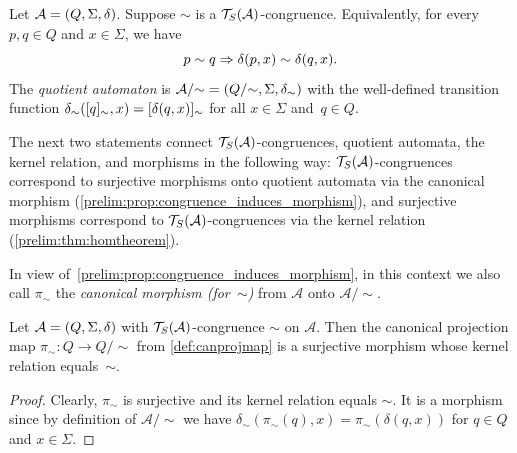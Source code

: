 
 \label{def:factor_aut}
Let $\mathcal A = (Q, \Sigma, \delta)$. Suppose $\sim$ is a $\mathcal T_S(\mathcal A)$-congruence. 
Equivalently, for every $p,q \in Q$ and $x \in \Sigma$,
we have
\begin{equation}\label{prelim:eqn:TS-congruence}
	p \sim q \Rightarrow \delta(p,x) \sim \delta(q,x).
\end{equation}
The \emph{quotient automaton} is $\mathcal A / {\sim} = (Q / {\sim}, \Sigma, \delta_{\sim})$ 
with the well-defined transition function $\delta_{\sim}([q]_{\sim},x) = [\delta(q,x)]_{\sim}$
for all $x \in \Sigma$ and~$q \in Q$.

The next two statements connect $\mathcal T_S(\mathcal A)$-congruences, quotient automata, the kernel relation, and morphisms
in the following way: $\mathcal T_S(\mathcal A)$-congruences
correspond to surjective morphisms onto quotient automata
via the canonical morphism (\cref{prelim:prop:congruence_induces_morphism}), and surjective morphisms
correspond to $\mathcal T_S(\mathcal A)$-congruences via the kernel relation (\cref{prelim:thm:homtheorem}).

In view of~\cref{prelim:prop:congruence_induces_morphism}, in this context we also call $\pi_{\sim}$
the \emph{canonical morphism (for~$\sim$)} 
from $\mathcal A$ onto $\mathcal A / {\sim}$. 

\begin{theorem}
	\label{prelim:prop:congruence_induces_morphism}
	Let $\mathcal A = (Q, \Sigma, \delta)$
	with $\mathcal T_S(\mathcal A)$-congruence $\sim$ on $\mathcal A$.
    Then the canonical projection map $\pi_{\sim} \colon Q \to Q / {\sim}$ from \cref{def:canprojmap}
    is a surjective morphism whose kernel relation equals~$\sim$.
\end{theorem}
\begin{proof}
	Clearly, $\pi_{\sim}$ is surjective and its kernel relation equals $\sim$.
	It is a morphism since by definition of $\mathcal A / {\sim}$
	we have $\delta_{\sim}(\pi_{\sim}(q), x) = \pi_{\sim}(\delta(q, x))$
	for $q \in Q$ and $x \in \Sigma$.
\end{proof}

